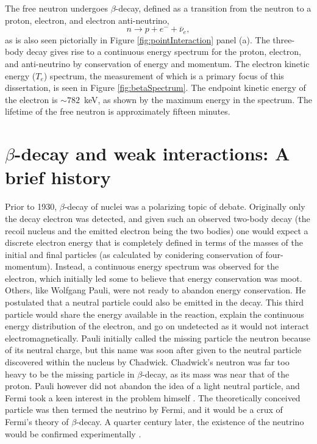 The free neutron undergoes $\beta$-decay, defined as a transition from the neutron
to a proton, electron, and electron anti-neutrino,
\begin{equation*}
  n\rightarrow p + e^- + \bar{\nu}_{e},
\end{equation*}
\noindent as is also seen pictorially in Figure \ref{fig:pointInteraction} panel (a).
The three-body decay gives rise to a continuous energy spectrum
for the proton, electron, and anti-neutrino by conservation of energy and momentum.
The electron kinetic energy ($T_e$) spectrum, the measurement of which is a primary focus of this
dissertation, is seen in Figure \ref{fig:betaSpectrum}. The endpoint kinetic energy of the electron
is $\sim 782$~keV, as shown by the maximum energy in the spectrum. The lifetime of the free neutron is
approximately fifteen minutes.


\section{$\beta$-decay and weak interactions: A brief history}

Prior to 1930, $\beta$-decay of nuclei was a polarizing topic of debate. Originally
only the decay electron was detected, and given such an observed two-body decay (the recoil
nucleus and the emitted electron being the two bodies) one would expect a discrete
electron energy that is completely defined in terms of the masses of the initial and
final particles (as calculated by conidering conservation of four-momentum).
Instead, a continuous energy spectrum was observed for the electron, which
initially led some to believe that energy conservation was moot. Others, like
Wolfgang Pauli, were not ready
to abandon energy conservation. He postulated that a neutral particle
could also be emitted in the decay. This third particle would share the energy available
in the reaction, explain the continuous energy distribution of the electron, and go
on undetected as it would not interact electromagnetically.
Pauli initially called the missing particle the neutron because of its neutral charge, but this name
was soon after given to the neutral particle discovered within the nucleus by Chadwick. Chadwick's
neutron was far too heavy
to be the missing particle in $\beta$-decay, as its mass was near that of the proton.
Pauli however did not abandon the idea of a light neutral particle, and Fermi took a keen
interest in the problem himself \cite{pauli1994writings}. The theoretically conceived particle was then termed
the neutrino by Fermi, and it would be a crux of Fermi's theory of $\beta$-decay.
A quarter century later, the existence of the neutrino would be confirmed
experimentally \cite{cowan1956detection}.

